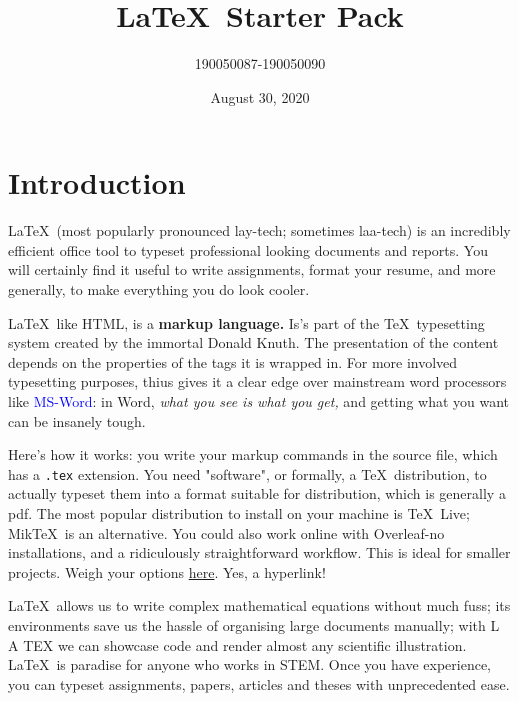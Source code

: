 \documentclass[10pt, Computer Modern]{article}
\begin{document}
\title{\LaTeX\ Starter Pack}
\author{190050087-190050090}
\date{August 30, 2020 }
\maketitle
\tableofcontents
\thispagestyle{empty}


\clearpage
\section{Introduction}
\label{intro}
\LaTeX\ (most popularly pronounced lay-tech; sometimes laa-tech) is an incredibly efficient office tool to typeset professional looking documents and reports. You will certainly find it useful to write assignments, format your resume, and more generally, to make everything you do look cooler.




\LaTeX\, like HTML, is a \textbf{markup language.} Is's part of the \TeX\ typesetting system created by the immortal Donald Knuth. The presentation of the content depends on the properties of the tags it is wrapped in. For more involved typesetting purposes, thius gives it a clear edge over mainstream word processors like \textcolor{blue}{MS-Word}: in Word, \textit{what you see is what you get,} and getting what you want can be insanely tough.




Here's how it works: you write your markup commands in the source file, which has a \verb!.tex! extension. You need "software", or formally, a \TeX\ distribution, to actually typeset them into a format suitable for distribution, which is generally a pdf. The most popular distribution to install on your machine is \TeX\ Live; Mik\TeX\ is an alternative. You could also work online with Overleaf-no installations, and a ridiculously straightforward workflow. This is ideal for smaller projects. Weigh your options \href{https://www.latex-project.org/get/}{here}. Yes, a hyperlink!



\LaTeX\ allows us to write complex mathematical equations without much fuss; its environments
save us the hassle of organising large documents manually; with L A TEX we can showcase code and
render almost any scientific illustration. \LaTeX\ is paradise for anyone who works in STEM. Once
you have experience, you can typeset assignments, papers, articles and theses with unprecedented
ease.
\end{document}
